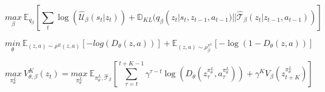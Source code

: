 \begin{equation}
    \label{formula:elbo}
    \underset{\beta}{max} \ \mathbb{E}_{q_{\beta}}\left[\sum_{t} \log(\mathcal{\hat{U}}_{\beta}(s_{t}|z_{t})) + \mathbb{D}_{KL}(q_{\beta}(z_{t}|s_{t},z_{t-1},a_{t-1})|| \mathcal{\hat{T}}_{\beta}(z_{t}|z_{t-1},a_{t-1})) \right]
\end{equation}

\begin{equation}
    \label{formula:discriminator}
    \underset{\theta}{min} \ \mathbb{E}_{(z,a) \sim \rho^{E}(z,a)} \left[-log(D_{\theta}(z,a))\right] + \mathbb{E}_{(z,a) \sim \rho^{\pi^{L}}_{\hat{\mathcal{T}}}} \left[-\log(1 - D_{\theta}(z,a))\right]
\end{equation}

\begin{equation}
    \label{formula:value_function}
    \underset{\pi^{L}_{\theta}}{max} \ V^{K}_{\theta,\beta}(z_{t}) = \underset{\pi^{L}_{\theta}}{max} \ \mathbb{E}_{\pi^{L}_{\theta}, \mathcal{\hat{T}}_{\beta}}\left[ \sum_{\tau = t}^{t+K-1} \gamma^{\tau-t} \log(D_{\theta}(z_{\tau}^{\pi^{L}_{\theta}}, a_{\tau}^{\pi^{L}_{\theta}})) + \gamma^{K}V_{\beta}(z_{t+K}^{\pi^{L}_{\theta}})\right]
\end{equation}
    
    